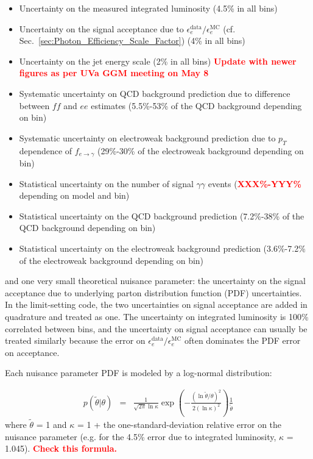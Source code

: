 \documentclass[dissertation.tex]{subfiles}
\begin{document}
\begin{itemize}
\item Uncertainty on the measured integrated luminosity (4.5\% in all bins) \cite{CMS_PAS_EWK-11-001}
\item Uncertainty on the signal acceptance due to $\epsilon_{e}^{\mathrm{data}}/\epsilon_{e}^{\mathrm{MC}}$ (cf. Sec.~\ref{sec:Photon_Efficiency_Scale_Factor}) (4\% in all bins)
\item Uncertainty on the jet energy scale (2\% in all bins)  \textcolor{red}{\textbf{Update with newer figures as per UVa GGM meeting on May 8}}
\item Systematic uncertainty on QCD background prediction due to difference between $\mathit{ff}$ and $ee$ estimates (5.5\%-53\% of the QCD background depending on bin)
\item Systematic uncertainty on electroweak background prediction due to $p_{T}$ dependence of $f_{e\rightarrow\gamma}$ (29\%-30\% of the electroweak background depending on bin)
\item Statistical uncertainty on the number of signal $\gamma\gamma$ events (\textcolor{red}{\textbf{XXX\%-YYY\%}} depending on model and bin)
\item Statistical uncertainty on the QCD background prediction (7.2\%-38\% of the QCD background depending on bin)
\item Statistical uncertainty on the electroweak background prediction (3.6\%-7.2\% of the electroweak background depending on bin)
\end{itemize}
%
and one very small theoretical nuisance parameter: the uncertainty on the signal acceptance due to underlying parton distribution function (PDF) uncertainties.  In the limit-setting code, the two uncertainties on signal acceptance are added in quadrature and treated as one.  The uncertainty on integrated luminosity is 100\% correlated between bins, and the uncertainty on signal acceptance can usually be treated similarly because the error on $\epsilon_{e}^{\mathrm{data}}/\epsilon_{e}^{\mathrm{MC}}$ often dominates the PDF error on acceptance.

Each nuisance parameter PDF is modeled by a log-normal distribution:

\begin{eqnarray}
\label{eq:log-normal}
p(\tilde{\theta} | \theta) &=& \frac{1}{\sqrt{2\pi}\ln\kappa} \exp(-\frac{(\ln\tilde{\theta}/\theta)^{2}}{2(\ln\kappa)^{2}})\frac{1}{\tilde{\theta}}
\end{eqnarray}
%
where $\tilde{\theta}$ = 1 and $\kappa$ = 1 + the one-standard-deviation relative error on the nuisance parameter (e.g. for the 4.5\% error due to integrated luminosity, $\kappa$ = 1.045).  \textcolor{red}{\textbf{Check this formula.}}
\end{document}
